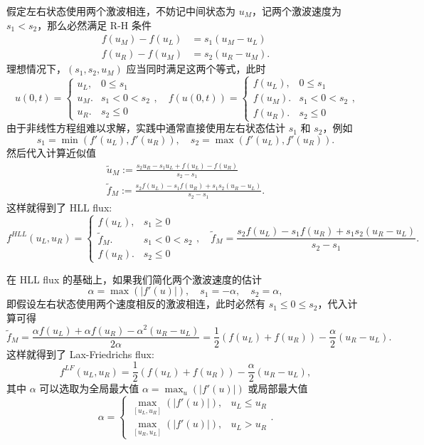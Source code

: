 假定左右状态使用两个激波相连，不妨记中间状态为 $u_M$，记两个激波速度为 $s_1 < s_2$，那么必然满足 R-H 条件
\begin{align*}
    f(u_M) - f(u_L) & = s_1(u_M - u_L) \\
    f(u_R) - f(u_M) & = s_2(u_R - u_M).
\end{align*}
理想情况下，$(s_1,s_2,u_M)$ 应当同时满足这两个等式，此时
\[
    u(0,t)  =
    \begin{cases}
        u_L, & 0 \le s_1     \\
        u_M. & s_1 < 0 < s_2 \\
        u_R. & s_2 \le 0
    \end{cases},
    \quad
    f(u(0,t))  =
    \begin{cases}
        f(u_L), & 0 \le s_1     \\
        f(u_M). & s_1 < 0 < s_2 \\
        f(u_R). & s_2 \le 0
    \end{cases},
\]
由于非线性方程组难以求解，实践中通常直接使用左右状态估计 $s_1$ 和 $s_2$，例如
\[
    s_1 = \min(f'(u_L),f'(u_R)),\quad
    s_2 = \max(f'(u_L),f'(u_R)).
\]
然后代入计算近似值
\begin{gather*}
    \tilde{u}_M := \frac{s_2 u_R - s_1 u_L + f(u_L) - f(u_R)}{s_2 - s_1}\\
    \tilde{f}_M := \frac{s_2 f(u_L) - s_1 f(u_R) + s_1 s_2(u_R - u_L)}{s_2 - s_1}.
\end{gather*}
这样就得到了 HLL flux:
\[
    f^{HLL}(u_L,u_R) =
    \begin{cases}
        f(u_L),      & s_1 \ge 0     \\
        \tilde{f}_M. & s_1 < 0 < s_2 \\
        f(u_R).      & s_2 \le 0
    \end{cases},
    \quad
    \tilde{f}_M = \frac{s_2 f(u_L) - s_1 f(u_R) + s_1 s_2(u_R - u_L)}{s_2 - s_1}.
\]

在 HLL flux 的基础上，如果我们简化两个激波速度的估计
\[
    \alpha = \max(|f'(u)|), \quad s_1 = -\alpha, \quad s_2 = \alpha,
\]
即假设左右状态使用两个速度相反的激波相连，此时必然有 $s_1 \le 0 \le s_2$，代入计算可得
\[
    \tilde{f}_M = \frac{\alpha f(u_L) + \alpha f(u_R) - \alpha^2(u_R - u_L)}{2 \alpha} =
    \frac12(f(u_L) + f(u_R))  - \frac{\alpha}2(u_R - u_L).
\]
这样就得到了 Lax-Friedrichs flux:
\[
    f^{LF}(u_L,u_R) =\frac12(f(u_L) + f(u_R))  - \frac{\alpha}2(u_R - u_L),
\]
其中 $\alpha$ 可以选取为全局最大值 $\alpha = \max_u(|f'(u)|)$ 或局部最大值
\[
    \alpha =
    \begin{cases}
        \max_{[u_L,u_R]}(|f'(u)|), & u_L \le u_R \\
        \max_{[u_R,u_L]}(|f'(u)|), & u_L > u_R
    \end{cases}.
\]
